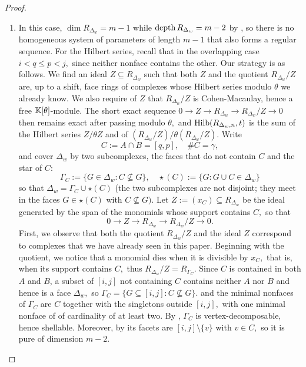 \begin{proof}
\begin{enumerate}
        \item In this case, $\dim R_{\Delta_w} = m - 1$ while $\mathrm{depth}\, R_{\Delta_w} = m - 2$ by , so there is no homogeneous system of parameters of length $m - 1$ that also forms a regular sequence. 
        For the Hilbert series, recall that in the overlapping case $i<q\leq p<j,$ since neither nonface contains the other. Our strategy is as follows. We find an ideal $Z\subseteq R_{\Delta_w}$ such that both $Z$ and the quotient $R_{\Delta_w}/Z$ are, up to a shift, face rings of complexes whose Hilbert series modulo $\theta$ we already know. We also require of $Z$ that $R_{\Delta_w}/Z$ is Cohen-Macaulay, hence a free $\mathbb{K}[\theta]$-module. The short exact sequence $0\to Z\to R_{\Delta_w}\to R_{\Delta_w}/Z\to 0$ then remains exact after passing modulo $\theta,$ and $\mathrm{Hilb}(R_{\Delta_w,n},t)$ is the sum of the Hilbert series $Z/\theta Z$ and of $(R_{\Delta_w}/Z)/\theta(R_{\Delta_w}/Z).$
        Write 
        \[
        C := A\cap B=[q,p],
        \quad\#C = \gamma,
        \]
        and cover $\Delta_w$ by two subcomplexes, the faces that do not contain $C$ and the star of $C:$
        \[
        \Gamma_C := \{G\in\Delta_w:C\not\subseteq G\},
        \quad
        \star(C) := \{G:G\cup C\in\Delta_w\}
        \]
        so that $\Delta_w = \Gamma_C\cup\star(C)$ (the two subcomplexes are not disjoint; they meet in the faces $G\in\star(C)$ with $C\not\subseteq G).$ 
        Let $Z := (x_C)\subseteq R_{\Delta_w}$ be the ideal generated by the span of the monomials whose support contains $C,$ so that
        \[
        0 \longrightarrow 
        Z \longrightarrow 
        R_{\Delta_w}\longrightarrow 
        R_{\Delta_w}/Z \longrightarrow 
        0.
        \]
        First, we observe that both the quotient $R_{\Delta_w}/Z$ and the ideal $Z$ correspond to complexes that we have already seen in this paper.
        Beginning with the quotient, we notice that a monomial dies when it is divisible by $x_C,$ that is, when its support contains $C,$ thus $R_{\Delta_w}/Z = R_{\Gamma_C}.$     
        Since $C$ is contained in both $A$ and $B$, a subset of $[i,j]$ not containing $C$ contains neither $A$ nor $B$ and hence is a face $\Delta_w,$ so $\Gamma_C = \{G\subseteq[i,j]:C\not\subseteq G\}.
        $ and the minimal nonfaces of $\Gamma_C$ are $C$ together with the singletons outside $[i,j],$ with one minimal nonface of of cardinality of at least two.
        By , $\Gamma_C$ is vertex-decomposable, hence shellable. Moreover, by  its facets are $[i,j]\setminus\{v\}$ with $v\in C,$ so it is pure of dimension $m - 2.$

\end{enumerate}
\end{proof}
